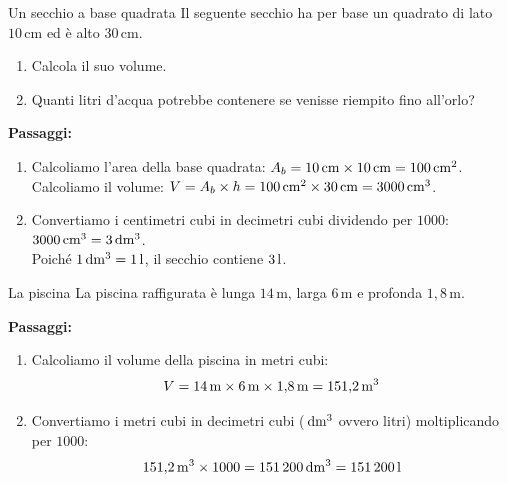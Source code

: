 \begin{esercizio}{Un secchio a base quadrata}
Il seguente secchio ha per base un quadrato di lato $10\,\mathrm{cm}$ ed è alto $30\,\mathrm{cm}$.


\begin{enumerate}[label=\alph*)]
  \item Calcola il suo volume.
  \item Quanti litri d'acqua potrebbe contenere se venisse riempito fino all'orlo?
\end{enumerate}

\responsespace{4.2cm}

\begin{soluzione}
  \textbf{Passaggi:}
  \begin{enumerate}[label=\alph*)]
    \item Calcoliamo l'area della base quadrata: $A_b = 10\,\mathrm{cm} \times 10\,\mathrm{cm} = 100\,\mathrm{cm^2}$.\\
    Calcoliamo il volume: $V = A_b \times h = 100\,\mathrm{cm^2} \times 30\,\mathrm{cm} = 3000\,\mathrm{cm^3}$.
    \item Convertiamo i centimetri cubi in decimetri cubi dividendo per $1000$: $3000\,\mathrm{cm^3} = 3\,\mathrm{dm^3}$.\\
    Poiché $1\,\mathrm{dm^3} = 1\,\mathrm{l}$, il secchio contiene $3\,\mathrm{l}$.
  \end{enumerate}
\end{soluzione}
\end{esercizio}
\condnewpage
\begin{esercizio}{La piscina}
La piscina raffigurata è lunga $14\,\mathrm{m}$, larga $6\,\mathrm{m}$ e profonda $1{,}8\,\mathrm{m}$.



\responsespace{4.5cm}

\begin{soluzione}
  \textbf{Passaggi:}
  \begin{enumerate}
    \item Calcoliamo il volume della piscina in metri cubi:
    \[
    V = 14\,\mathrm{m} \times 6\,\mathrm{m} \times 1{,}8\,\mathrm{m} = 151{,}2\,\mathrm{m^3}
    \]
    \item Convertiamo i metri cubi in decimetri cubi ($\,\mathrm{dm^3}$ ovvero litri) moltiplicando per $1000$:
    \[
    151{,}2\,\mathrm{m^3} \times 1000 = 151\,200\,\mathrm{dm^3} = 151\,200\,\mathrm{l}
    \]
  \end{enumerate}
\end{soluzione}
\end{esercizio}

